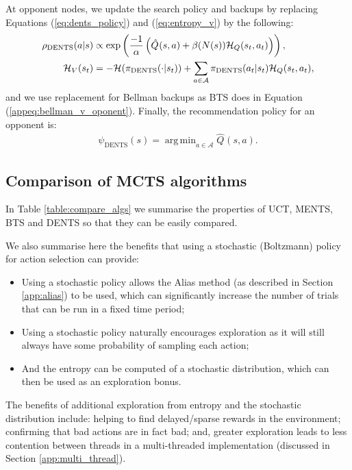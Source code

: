 \documentclass{article}
\newcommand{\cl}[1]{\mathcal{#1}}
\newcommand{\Qt}[3]{\hat{Q}^{#3}(#1,#2)}
\DeclareMathOperator*{\argmin}{arg\,min}
\theoremstyle{plain}
\begin{document}
\begin{appendices}
            At opponent nodes, we update the search policy and backups by replacing Equations (\ref{eq:dents_policy}) and (\ref{eq:entropy_v}) by the following:
            \begin{align}
                \rho_{\textnormal{DENTS}}(a|s) &\propto \exp\left(\frac{-1}{\alpha}\left(\Qt{s}{a}{} + \beta(N(s))\cl{H}_Q(s_t,a_t) \right)\right), \\ 
                \cl{H}_V(s_t) &= -\cl{H}(\pi_{\textnormal{DENTS}}(\cdot | s_t)) + \sum_{a\in\cl{A}} \pi_{\textnormal{DENTS}}(a_t|s_t)\cl{H}_Q(s_t,a_t), 
            \end{align}
            and we use replacement for Bellman backups as BTS does in Equation (\ref{appeq:bellman_v_oponent}). Finally, the recommendation policy for an opponent is:
            \begin{align}
                \psi_{\text{DENTS}}(s)=\argmin_{a\in\cl{A}}\Qt{s}{a}{}.
            \end{align}
            
            
	
	\subsection{Comparison of MCTS algorithms} \label{app:comparison_table}
		
		In Table \ref{table:compare_algs} we summarise the properties of UCT, MENTS, BTS and DENTS so that they can be easily compared.
		
		We also summarise here the benefits that using a stochastic (Boltzmann) policy for action selection can provide:
		\begin{itemize}
			\item Using a stochastic policy allows the Alias method (as described in Section \ref{app:alias}) to be used, which can significantly increase the number of trials that can be run in a fixed time period;
			\item Using a stochastic policy naturally encourages exploration as it will still always have some probability of sampling each action;
			\item And the entropy can be computed of a stochastic distribution, which can then be used as an exploration bonus.
		\end{itemize}
		
		The benefits of additional exploration from entropy and the stochastic distribution include: helping to find delayed/sparse rewards in the environment; confirming that bad actions are in fact bad; and, greater exploration leads to less contention between threads in a multi-threaded implementation (discussed in Section \ref{app:multi_thread}).
				 

\end{appendices}
\end{document}
